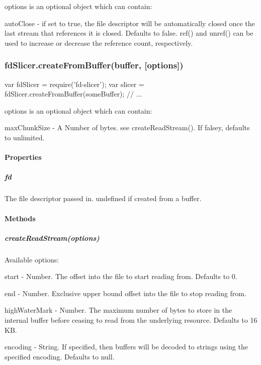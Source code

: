 {\ttfamily options} is an optional object which can contain\+:


\begin{DoxyItemize}
\item {\ttfamily auto\+Close} -\/ if set to {\ttfamily true}, the file descriptor will be automatically closed once the last stream that references it is closed. Defaults to {\ttfamily false}. {\ttfamily ref()} and {\ttfamily unref()} can be used to increase or decrease the reference count, respectively.
\end{DoxyItemize}

\subsubsection*{fd\+Slicer.\+create\+From\+Buffer(buffer, \mbox{[}options\mbox{]})}


\begin{DoxyCode}
var fdSlicer = require('fd-slicer');
var slicer = fdSlicer.createFromBuffer(someBuffer);
// ...
\end{DoxyCode}


{\ttfamily options} is an optional object which can contain\+:


\begin{DoxyItemize}
\item {\ttfamily max\+Chunk\+Size} -\/ A {\ttfamily Number} of bytes. see {\ttfamily create\+Read\+Stream()}. If falsey, defaults to unlimited.
\end{DoxyItemize}

\paragraph*{Properties}

\subparagraph*{fd}

The file descriptor passed in. {\ttfamily undefined} if created from a buffer.

\paragraph*{Methods}

\subparagraph*{create\+Read\+Stream(options)}

Available {\ttfamily options}\+:


\begin{DoxyItemize}
\item {\ttfamily start} -\/ Number. The offset into the file to start reading from. Defaults to 0.
\item {\ttfamily end} -\/ Number. Exclusive upper bound offset into the file to stop reading from.
\item {\ttfamily high\+Water\+Mark} -\/ Number. The maximum number of bytes to store in the internal buffer before ceasing to read from the underlying resource. Defaults to 16 KB.
\item {\ttfamily encoding} -\/ String. If specified, then buffers will be decoded to strings using the specified encoding. Defaults to {\ttfamily null}.
\end{DoxyItemize}

